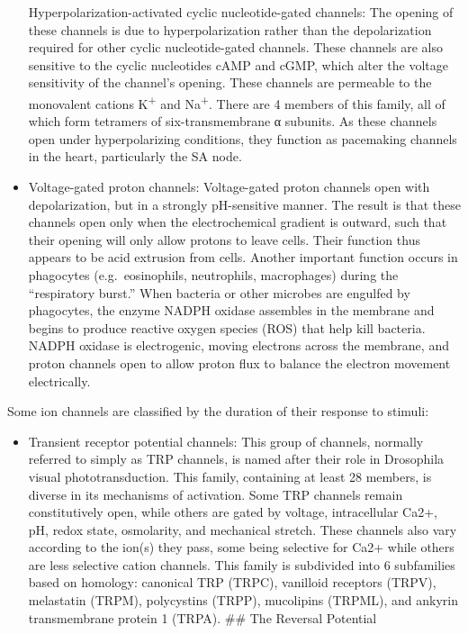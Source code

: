 \begin{itemize}
  Hyperpolarization-activated cyclic nucleotide-gated channels: The opening of these channels is due to hyperpolarization rather than the depolarization required for other cyclic nucleotide-gated channels. These channels are also sensitive to the cyclic nucleotides cAMP and cGMP, which alter the voltage sensitivity of the channel's opening. These channels are permeable to the monovalent cations K\textsuperscript{+} and Na\textsuperscript{+}. There are 4 members of this family, all of which form tetramers of six-transmembrane α subunits. As these channels open under hyperpolarizing conditions, they function as pacemaking channels in the heart, particularly the SA node.
\item
  Voltage-gated proton channels: Voltage-gated proton channels open with depolarization, but in a strongly pH-sensitive manner. The result is that these channels open only when the electrochemical gradient is outward, such that their opening will only allow protons to leave cells. Their function thus appears to be acid extrusion from cells. Another important function occurs in phagocytes (e.g.~eosinophils, neutrophils, macrophages) during the ``respiratory burst.'' When bacteria or other microbes are engulfed by phagocytes, the enzyme NADPH oxidase assembles in the membrane and begins to produce reactive oxygen species (ROS) that help kill bacteria. NADPH oxidase is electrogenic, moving electrons across the membrane, and proton channels open to allow proton flux to balance the electron movement electrically.
\end{itemize}

Some ion channels are classified by the duration of their response to stimuli:

\begin{itemize}
\tightlist
\item
  Transient receptor potential channels: This group of channels, normally referred to simply as TRP channels, is named after their role in Drosophila visual phototransduction. This family, containing at least 28 members, is diverse in its mechanisms of activation. Some TRP channels remain constitutively open, while others are gated by voltage, intracellular Ca2+, pH, redox state, osmolarity, and mechanical stretch. These channels also vary according to the ion(s) they pass, some being selective for Ca2+ while others are less selective cation channels. This family is subdivided into 6 subfamilies based on homology: canonical TRP (TRPC), vanilloid receptors (TRPV), melastatin (TRPM), polycystins (TRPP), mucolipins (TRPML), and ankyrin transmembrane protein 1 (TRPA).
  \#\# The Reversal Potential
\end{itemize}

